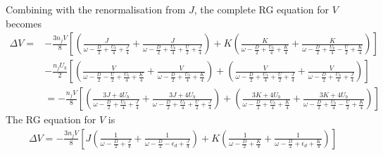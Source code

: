 \documentclass[reprint,superscriptaddress,floatfix]{revtex4-2}
\begin{document}
\begin{widetext}
Combining with the renormalisation from \(J\), the complete RG equation for \(V\) becomes
\begin{equation}\begin{aligned}
	\Delta V =& -\frac{3n_j V}{8}\left[\left(\frac{J}{\omega - \frac{D}{2} + \frac{U_b}{4} + \frac{J}{4}} + \frac{J}{\omega - \frac{D}{2} + \frac{U_b}{4} + \frac{U}{2} + \frac{J}{4}}\right) + K \left(\frac{K}{\omega - \frac{D}{2} + \frac{U_b}{4} + \frac{K}{4}} + \frac{K}{\omega - \frac{D}{2} + \frac{U_b}{4} - \frac{U}{2} + \frac{K}{4}}\right)\right]\\
		 &-\frac{n_jU_b}{2}\left[\left(\frac{V}{\omega - \frac{D}{2} - \frac{U}{2} + \frac{U_b}{4} + \frac{K}{4}} + \frac{V}{\omega - \frac{D}{2} + \frac{U_b}{4} + \frac{K}{4}}\right) + \left(\frac{V}{\omega - \frac{D}{2} + \frac{U_b}{4} + \frac{U}{2} + \frac{J}{4}} + \frac{V}{\omega - \frac{D}{2} + \frac{U_b}{4} + \frac{J}{4}}\right)\right]\\
		 &=-\frac{n_j V}{8}\left[\left(\frac{3J + 4U_b}{\omega - \frac{D}{2} + \frac{U_b}{4} + \frac{J}{4}} + \frac{3J + 4U_b}{\omega - \frac{D}{2} + \frac{U_b}{4} + \frac{U}{2} + \frac{J}{4}}\right) + \left(\frac{3K + 4U_b}{\omega - \frac{D}{2} + \frac{U_b}{4} + \frac{K}{4}} + \frac{3K + 4U_b}{\omega - \frac{D}{2} + \frac{U_b}{4} - \frac{U}{2} + \frac{K}{4}}\right)\right]
\end{aligned}\end{equation}
The RG equation for \(V\) is
\begin{equation}\begin{aligned}
	\Delta V = -\frac{3n_j V}{8}\left[J\left(\frac{1}{\omega - \frac{D}{2} + \frac{J}{4}} + \frac{1}{\omega - \frac{D}{2} - \epsilon_d + \frac{J}{4}}\right) + K \left(\frac{1}{\omega - \frac{D}{2} + \frac{K}{4}} + \frac{1}{\omega - \frac{D}{2} + \epsilon_d + \frac{K}{4}}\right)\right]
\end{aligned}\end{equation}


\end{widetext}
\end{document}
